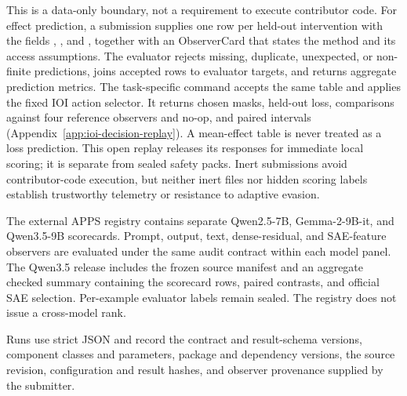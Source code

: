 This is a data-only boundary, not a requirement to execute contributor code.
For effect prediction, a submission supplies one row per held-out intervention
with the fields , , and
, together with an ObserverCard that states the method
and its access assumptions. The evaluator rejects missing, duplicate,
unexpected, or non-finite predictions, joins accepted rows to evaluator targets,
and returns aggregate prediction metrics. The task-specific
 command accepts the same table and applies
the fixed IOI action selector. It returns chosen masks, held-out loss,
comparisons against four reference observers and no-op, and paired intervals
(Appendix~\ref{app:ioi-decision-replay}). A mean-effect table is never treated
as a loss prediction. This open replay releases its responses for immediate
local scoring; it is separate from sealed safety packs. Inert submissions
avoid contributor-code execution, but neither inert files nor hidden scoring
labels establish trustworthy telemetry or resistance to adaptive evasion.

The external APPS registry contains separate Qwen2.5-7B, Gemma-2-9B-it, and
Qwen3.5-9B scorecards. Prompt, output, text, dense-residual, and SAE-feature
observers are evaluated under the same audit contract within each model panel.
The Qwen3.5 release includes the frozen source manifest and an aggregate
checked summary containing the scorecard rows, paired contrasts, and official
SAE selection. Per-example evaluator labels remain sealed. The registry does
not issue a cross-model rank.

Runs use strict JSON and record
the contract and result-schema versions, component classes and parameters,
package and dependency versions, the source revision, configuration and result
hashes, and observer provenance supplied by the submitter.


